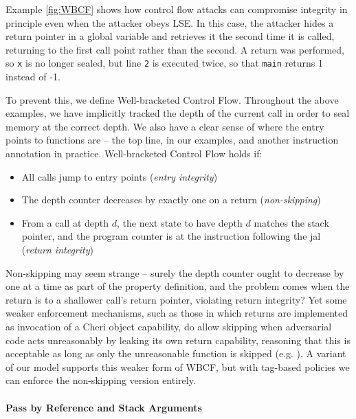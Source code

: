 \documentclass[acmsmall,review,anonymous]{acmart}\settopmatter{printfolios=true,printccs=false,printacmref=false}
\begin{document}
Example \ref{fig:WBCF} shows how control flow attacks can compromise integrity in principle
even when the attacker obeys LSE. In this case, the attacker hides a return pointer in a
global variable and retrieves it the second time it is called, returning to the first call
point rather than the second. A return was performed, so {\tt x} is no longer sealed, but
line {\tt 2} is executed twice, so that {\tt main} returns 1 instead of -1.

To prevent this, we define Well-bracketed Control Flow. Throughout the above examples, we
have implicitly tracked the depth of the current call in order to seal memory at the correct
depth. We also have a clear sense of where the entry points to functions are -- the top line,
in our examples, and another instruction annotation in practice. Well-bracketed Control Flow
holds if:

\begin{itemize}
\item All calls jump to entry points ({\em entry integrity})
\item The depth counter decreases by exactly one on a return ({\em non-skipping})
\item From a call at depth \(d\), the next state to have depth \(d\) matches the stack pointer,
  and the program counter is at the instruction following the jal ({\em return integrity})
\end{itemize}

Non-skipping may seem strange -- surely the depth counter ought to decrease by one at a time
as part of the property definition, and the problem comes when the return is to a shallower
call's return pointer, violating return integrity? Yet some weaker enforcement mechanisms,
such as those in which returns are implemented as invocation of a Cheri object capability,
do allow skipping when adversarial code acts unreasonably by leaking its own return capability,
reasoning that this is acceptable as long as only the unreasonable function is skipped
(e.g. \citep{Skorstengaard+19b}). A variant of our model supports this weaker form of WBCF,
but with tag-based policies we can enforce the non-skipping version entirely.

\paragraph*{Pass by Reference and Stack Arguments}
\end{document}
